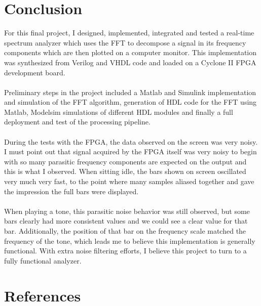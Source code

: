 \documentclass[letterpaper, titlepage, 11pt]{article}
\begin{document}
\section{Conclusion}
For this final project, I designed, implemented, integrated and tested a real-time spectrum analyzer which uses the FFT to decompose a signal in its frequency components which are then plotted on a computer monitor. This implementation was synthesized from Verilog and VHDL code and loaded on a Cyclone II FPGA development board.\\
\\
Preliminary steps in the project included a Matlab and Simulink implementation and simulation of the FFT algorithm, generation of HDL code for the FFT using Matlab, Modelsim simulations of different HDL modules and finally a full deployment and test of the processing pipeline.\\
\\
During the tests with the FPGA, the data observed on the screen was very noisy. I must point out that signal acquired by the FPGA itself was very noisy to begin with so many parasitic frequency components are expected on the output and this is what I observed. When sitting idle, the bars shown on screen oscillated very much very fast, to the point where many samples aliased together and gave the impression the full bars were displayed.\\
\\
When playing a tone, this parasitic noise behavior was still observed, but some bars clearly had more consistent values and we could see a clear value for that bar. Additionally, the position of that bar on the frequency scale matched the frequency of the tone, which leads me to believe this implementation is generally functional. With extra noise filtering efforts, I believe this project to turn to a fully functional analyzer.


\section{References}


\end{document}
